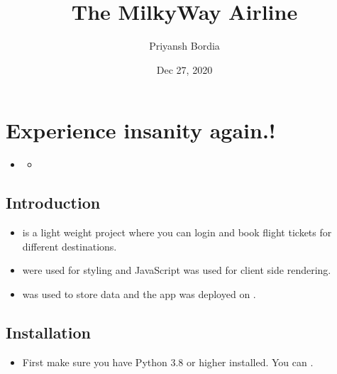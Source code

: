 \documentclass[letterpaper,10pt,english]{sphinxmanual}
\title{The MilkyWay Airline}
\date{Dec 27, 2020}
\author{Priyansh Bordia}
\begin{document}
\pagestyle{empty}
\sphinxmaketitle
\pagestyle{plain}
\sphinxtableofcontents
\pagestyle{normal}
\label{\detokenize{index::doc}}



\chapter{Experience insanity again.!}
\label{\detokenize{index:experience-insanity-again}}
\begin{sphinxShadowBox}
\begin{itemize}
\item {} 
\label{\detokenize{index:id1}}{\hyperref[\detokenize{index:the-milkyway-airlines}]{}}
\begin{itemize}
\item {} 
\label{\detokenize{index:id2}}{\hyperref[\detokenize{index:experience-insanity-again}]{}}

\end{itemize}

\end{itemize}
\end{sphinxShadowBox}


\section{Introduction}
\label{\detokenize{index:introduction}}\begin{itemize}
\item {} 
 is a light weight  project where you can login and book flight tickets for different destinations.

\item {} 
   were used for styling and JavaScript was used for client side rendering.

\item {} 
 was used to store data and the app was deployed on .

\end{itemize}


\section{Installation}
\label{\detokenize{index:installation}}\begin{itemize}
\item {} 
First make sure you have Python 3.8 or higher installed. You can  .

\end{itemize}
\end{document}
